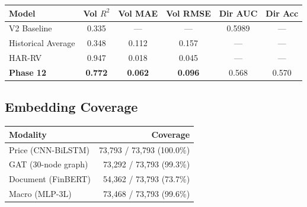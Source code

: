 \documentclass[12pt,a4paper]{article}
\begin{document}
\begin{center}
\begin{tabular}{lccccc}
\hline
\textbf{Model} & \textbf{Vol $R^2$} & \textbf{Vol MAE} & \textbf{Vol RMSE}
               & \textbf{Dir AUC} & \textbf{Dir Acc} \\
\hline
V2 Baseline         & 0.335  & ---    & ---    & 0.5989 & ---    \\
Historical Average  & 0.348  & 0.112  & 0.157  & ---    & ---    \\
HAR-RV              & 0.947  & 0.018  & 0.045  & ---    & ---    \\
\textbf{Phase 12}   & \textbf{0.772} & \textbf{0.062} & \textbf{0.096}
                    & 0.568  & 0.570  \\
\hline
\end{tabular}
\end{center}

\subsection{Embedding Coverage}

\begin{center}
\begin{tabular}{lr}
\hline
\textbf{Modality} & \textbf{Coverage} \\
\hline
Price (CNN-BiLSTM)    & 73,793 / 73,793 (100.0\%) \\
GAT (30-node graph)   & 73,292 / 73,793 (99.3\%) \\
Document (FinBERT)    & 54,362 / 73,793 (73.7\%) \\
Macro (MLP-3L)        & 73,468 / 73,793 (99.6\%) \\
\hline
\end{tabular}
\end{center}
\end{document}
